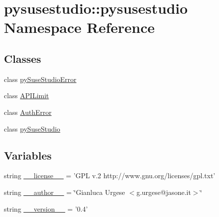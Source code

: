 \hypertarget{namespacepysusestudio_1_1pysusestudio}{
\section{pysusestudio::pysusestudio Namespace Reference}
\label{namespacepysusestudio_1_1pysusestudio}
}
\subsection*{Classes}
\begin{DoxyCompactItemize}
\item 
class \hyperlink{classpysusestudio_1_1pysusestudio_1_1py_suse_studio_error}{pySuseStudioError}
\item 
class \hyperlink{classpysusestudio_1_1pysusestudio_1_1_a_p_i_limit}{APILimit}
\item 
class \hyperlink{classpysusestudio_1_1pysusestudio_1_1_auth_error}{AuthError}
\item 
class \hyperlink{classpysusestudio_1_1pysusestudio_1_1py_suse_studio}{pySuseStudio}
\end{DoxyCompactItemize}
\subsection*{Variables}
\begin{DoxyCompactItemize}
\item 
string \hyperlink{namespacepysusestudio_1_1pysusestudio_abe9d0e42445b13ae1596ad298d620219}{\_\-\_\-license\_\-\_\-} = 'GPL v.2 http://www.gnu.org/licenses/gpl.txt'
\item 
string \hyperlink{namespacepysusestudio_1_1pysusestudio_aacbb9fe95948329159fcede525a76a07}{\_\-\_\-author\_\-\_\-} = \char`\"{}Gianluca Urgese $<$g.urgese@jasone.it$>$\char`\"{}
\item 
string \hyperlink{namespacepysusestudio_1_1pysusestudio_ab165d16997c47cc84bce008ef12ed6b7}{\_\-\_\-version\_\-\_\-} = '0.4'
\end{DoxyCompactItemize}


